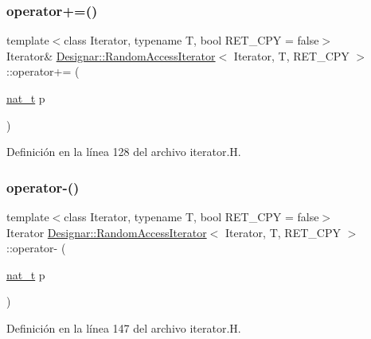 \subsubsection{\texorpdfstring{operator+=()}{operator+=()}}
{\footnotesize\ttfamily template$<$class Iterator, typename T, bool R\+E\+T\+\_\+\+C\+PY = false$>$ \\
Iterator\& \hyperlink{class_designar_1_1_random_access_iterator}{Designar\+::\+Random\+Access\+Iterator}$<$ Iterator, T, R\+E\+T\+\_\+\+C\+PY $>$\+::operator+= (\begin{DoxyParamCaption}\item[{\hyperlink{namespace_designar_aa72662848b9f4815e7bf31a7cf3e33d1}{nat\+\_\+t}}]{p }\end{DoxyParamCaption})\hspace{0.3cm}{\ttfamily [inline]}}



Definición en la línea 128 del archivo iterator.\+H.

\mbox{\label{class_designar_1_1_random_access_iterator_ab59d5341ccba07c66bf2f6a904d5a6c1}} 
\subsubsection{\texorpdfstring{operator-\/()}{operator-()}}
{\footnotesize\ttfamily template$<$class Iterator, typename T, bool R\+E\+T\+\_\+\+C\+PY = false$>$ \\
Iterator \hyperlink{class_designar_1_1_random_access_iterator}{Designar\+::\+Random\+Access\+Iterator}$<$ Iterator, T, R\+E\+T\+\_\+\+C\+PY $>$\+::operator-\/ (\begin{DoxyParamCaption}\item[{\hyperlink{namespace_designar_aa72662848b9f4815e7bf31a7cf3e33d1}{nat\+\_\+t}}]{p }\end{DoxyParamCaption})\hspace{0.3cm}{\ttfamily [inline]}}



Definición en la línea 147 del archivo iterator.\+H.

\mbox{\label{class_designar_1_1_random_access_iterator_ac7ede306e0004e8c178059ede8e239ba}} 
